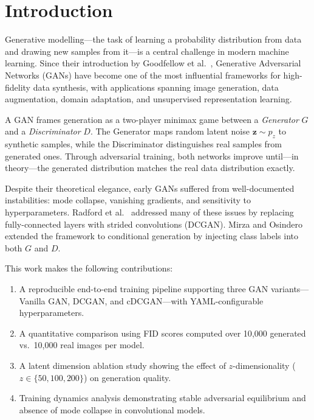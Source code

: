 \documentclass[conference]{IEEEtran}
\begin{document}
\section{Introduction}

Generative modelling---the task of learning a probability distribution from data and drawing new samples from it---is a central challenge in modern machine learning. Since their introduction by Goodfellow et al.\ \cite{goodfellow2014generative}, Generative Adversarial Networks (GANs) have become one of the most influential frameworks for high-fidelity data synthesis, with applications spanning image generation, data augmentation, domain adaptation, and unsupervised representation learning.

A GAN frames generation as a two-player minimax game between a \emph{Generator} $G$ and a \emph{Discriminator} $D$. The Generator maps random latent noise $\mathbf{z} \sim p_z$ to synthetic samples, while the Discriminator distinguishes real samples from generated ones. Through adversarial training, both networks improve until---in theory---the generated distribution matches the real data distribution exactly.

Despite their theoretical elegance, early GANs suffered from well-documented instabilities: mode collapse, vanishing gradients, and sensitivity to hyperparameters. Radford et al.\ \cite{radford2015dcgan} addressed many of these issues by replacing fully-connected layers with strided convolutions (DCGAN). Mirza and Osindero \cite{mirza2014cgan} extended the framework to conditional generation by injecting class labels into both $G$ and $D$.

This work makes the following contributions:
\begin{enumerate}
    \item A reproducible end-to-end training pipeline supporting three GAN variants---Vanilla GAN, DCGAN, and cDCGAN---with YAML-configurable hyperparameters.
    \item A quantitative comparison using FID scores computed over 10{,}000 generated vs.\ 10{,}000 real images per model.
    \item A latent dimension ablation study showing the effect of $z$-dimensionality ($z \in \{50, 100, 200\}$) on generation quality.
    \item Training dynamics analysis demonstrating stable adversarial equilibrium and absence of mode collapse in convolutional models.
\end{enumerate}
\end{document}
